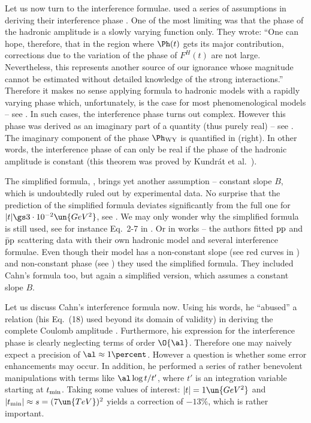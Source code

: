 Let us now turn to the interference formulae. \WaY{} used a series of assumptions in deriving their interference phase . One of the most limiting was that the phase of the hadronic amplitude is a slowly varying function only. They wrote: ``One can hope, therefore, that in the region where $\Ph(t)$ gets its major contribution, corrections due to the variation of the phase of $F^H(t)$ are not large. Nevertheless, this represents another source of our ignorance whose magnitude cannot be estimated without detailed knowledge of the strong interactions.'' Therefore it makes no sense applying \WaY{} formula to hadronic models with a rapidly varying phase which, unfortunately, is the case for most phenomenological models -- see . In such cases, the interference phase  turns out complex. However this phase was derived as an imaginary part of a quantity (thus purely real) -- see . The imaginary component of the phase $\Ph_{\rm WY}$ is quantified in  (right). In other words, the interference phase of \WaY{} can only be real if the phase of the hadronic amplitude is constant (this theorem was proved by Kundr\' at et al.\ ).

The simplified \WaY{} formula, , brings yet another assumption -- constant slope $B$, which is undoubtedly ruled out by experimental data. No surprise that the prediction of the simplified formula deviates significantly from the full one for $|t| \gs 3\cdot 10^{-2}\un{GeV^2}$, see . We may only wonder why the simplified formula is still used, see for instance Eq.~2-7 in    .
Or in works  -- the authors fitted $\rm pp$ and $\rm\bar pp$ scattering data with their own hadronic model and several interference formulae. Even though their model has a non-constant slope (see red curves in ) and non-constant phase (see ) they used the simplified \WY{} formula. They included Cahn's formula too, but again a simplified version, which assumes a constant slope $B$.


Let us discuss Cahn's interference formula  now. Using his words, he ``abused'' a relation (his Eq.~(18) used beyond its domain of validity) in deriving the complete Coulomb amplitude . Furthermore, his expression for the interference phase is clearly neglecting terms of order $\O{\al}$. Therefore one may naively expect a precision of $\al\approx 1\percent$. However a question is whether some error enhancements may occur. In addition, he performed a series of rather benevolent manipulations with terms like $\al \log t/ t'$, where $t'$ is an integration variable starting at $t_{\rm min}$. Taking some values of interest: $|t| = 1\un{GeV^2}$ and $|t_{\rm min}| \approx s = (7\un{TeV})^2$ yields a correction of $-13\percent$, which is rather important.

